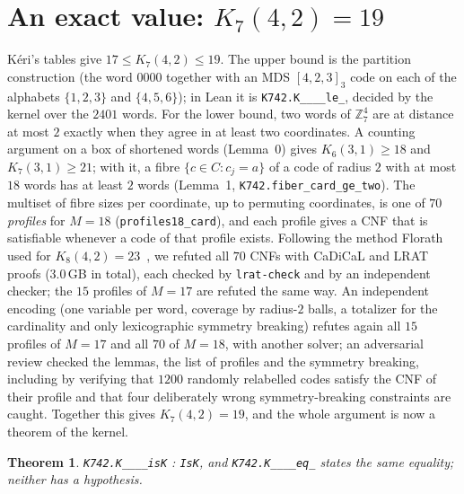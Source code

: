 \documentclass[11pt]{amsart}
\newtheorem{theorem}{Theorem}
\theoremstyle{definition}
\theoremstyle{remark}
\begin{document}
\section{An exact value: $K_7(4,2)=19$}\label{sec:k742}
Kéri's tables give $17\le K_7(4,2)\le 19$.
The upper bound is the partition construction (the word $0000$ together with an MDS $[4,2,3]_3$ code on each of the alphabets $\{1,2,3\}$ and $\{4,5,6\}$); in Lean it is \texttt{K742.\allowbreak K\_\_\_\_\allowbreak le\_}, decided by the kernel over the $2401$ words.
For the lower bound, two words of $\mathbb{Z}_7^4$ are at distance at most $2$ exactly when they agree in at least two coordinates.
A counting argument on a box of shortened words (Lemma~0) gives $K_6(3,1)\ge 18$ and $K_7(3,1)\ge 21$; with it, a fibre $\{c\in C: c_j=a\}$ of a code of radius $2$ with at most $18$ words has at least $2$ words (Lemma~1, \texttt{K742.\allowbreak fiber\_\allowbreak card\_\allowbreak ge\_\allowbreak two}).
The multiset of fibre sizes per coordinate, up to permuting coordinates, is one of $70$ \emph{profiles} for $M=18$ (\texttt{profiles18\_\allowbreak card}), and each profile gives a CNF that is satisfiable whenever a code of that profile exists.
Following the method Florath used for $K_8(4,2)=23$~\cite{florath2026}, we refuted all $70$ CNFs with CaDiCaL and LRAT proofs ($3.0$\,GB in total), each checked by \texttt{lrat-check} and by an independent checker; the $15$ profiles of $M=17$ are refuted the same way.
An independent encoding (one variable per word, coverage by radius-$2$ balls, a totalizer for the cardinality and only lexicographic symmetry breaking) refutes again all $15$ profiles of $M=17$ and all $70$ of $M=18$, with another solver; an adversarial review checked the lemmas, the list of profiles and the symmetry breaking, including by verifying that $1200$ randomly relabelled codes satisfy the CNF of their profile and that four deliberately wrong symmetry-breaking constraints are caught.
Together this gives $K_7(4,2)=19$, and the whole argument is now a theorem of the kernel.

\begin{theorem}\label{thm:k742}
\texttt{K742.\allowbreak K\_\_\_\_\allowbreak isK} : \texttt{IsK}, and \texttt{K742.\allowbreak K\_\_\_\_\allowbreak eq\_} states the same equality; neither has a hypothesis.
\end{theorem}
\end{document}
